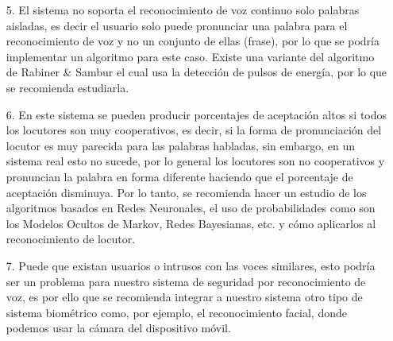 \begin{enumerate}
\item[5.]El sistema no soporta el reconocimiento de voz continuo solo palabras aisladas, es decir el usuario solo puede pronunciar una palabra para el reconocimiento de voz y no un conjunto de ellas (frase), por lo que se podría implementar un algoritmo para este caso. Existe una variante del algoritmo de Rabiner \& Sambur el cual usa la detección de pulsos de energía, por lo que se recomienda estudiarla.

\item[6.]En este sistema se pueden producir porcentajes de aceptación altos si todos los locutores son muy cooperativos, es decir, si la forma de pronunciación del locutor es muy parecida para las palabras habladas, sin embargo, en un sistema real esto no sucede, por lo general los locutores son no cooperativos y pronuncian la palabra en forma diferente haciendo que el porcentaje de aceptación disminuya. Por lo tanto, se recomienda hacer un estudio de los algoritmos basados en Redes Neuronales, el uso de probabilidades como son los Modelos Ocultos de Markov, Redes Bayesianas, etc. y cómo aplicarlos al reconocimiento de locutor.

\item[7.]Puede que existan usuarios o intrusos con las voces similares, esto podría ser un problema para nuestro sistema de seguridad por reconocimiento de voz, es por ello que se recomienda integrar a nuestro sistema otro tipo de sistema biométrico como, por ejemplo, el reconocimiento facial, donde podemos usar la cámara del dispositivo móvil.
\end{enumerate}

